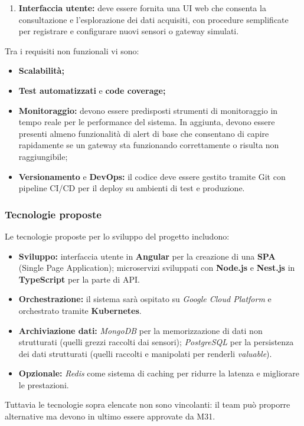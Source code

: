 \documentclass[a4paper,11pt]{article}
\begin{document}
\begin{enumerate}[noitemsep, topsep=0pt]
  \item \textbf{Interfaccia utente:} deve essere fornita una UI web che consenta la consultazione e l’esplorazione dei dati acquisiti, 
  con procedure semplificate per registrare e configurare nuovi sensori o gateway simulati.
\end{enumerate}
Tra i requisiti non funzionali vi sono: 
\begin{itemize}[noitemsep, topsep=0pt]
  \item \textbf{Scalabilità;}
  \item \textbf{Test automatizzati} e \textbf{code coverage;}
  \item \textbf{Monitoraggio:} devono essere predisposti strumenti di monitoraggio in tempo reale per le performance del sistema. 
  In aggiunta, devono essere presenti almeno funzionalità di alert di base che consentano di capire rapidamente 
  se un gateway sta funzionando correttamente o risulta non raggiungibile;
  \item \textbf{Versionamento} e \textbf{DevOps:} il codice deve essere gestito tramite Git con pipeline CI/CD 
  per il deploy su ambienti di test e produzione.
\end{itemize}

\subsubsection{Tecnologie proposte}
Le tecnologie proposte per lo sviluppo del progetto includono:
\begin{itemize}[noitemsep, topsep=0pt]
  \item \textbf{Sviluppo:} 
  interfaccia utente in \textbf{Angular} per la creazione di una \textbf{SPA} (Single Page Application); 
  microservizi sviluppati con \textbf{Node.js} e \textbf{Nest.js} in \textbf{TypeScript} per la parte di API.
  
  \item \textbf{Orchestrazione:} 
  il sistema sarà ospitato su \textit{Google Cloud Platform} e orchestrato tramite \textbf{Kubernetes}.
  
  \item \textbf{Archiviazione dati:} 
  \textit{MongoDB} per la memorizzazione di dati non strutturati (quelli grezzi raccolti dai sensori); 
  \textit{PostgreSQL} per la persistenza dei dati strutturati (quelli raccolti e manipolati per renderli \textit{valuable}).
  
  \item \textbf{Opzionale:} 
  \textit{Redis} come sistema di caching per ridurre la latenza e migliorare le prestazioni.
\end{itemize}
Tuttavia le tecnologie sopra elencate non sono vincolanti: il team può proporre alternative ma devono in ultimo essere approvate da M31.
\end{document}
